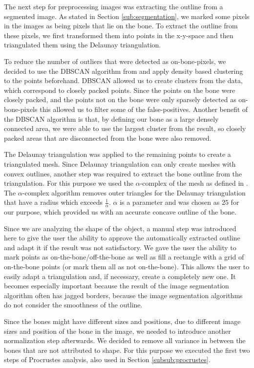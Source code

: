 \documentclass[pdftex,12pt,a4paper]{report}
\begin{document}
The next step for preprocessing images was extracting the outline from a segmented image. As stated in Section
\ref{sub:segmentation}, we marked some pixels in the images as being pixels that lie on the bone.
To extract the outline from these pixels, we first transformed them into points in the x-y-space and then
triangulated them using the Delaunay triangulation.

To reduce the number of outliers that were detected as on-bone-pixels,
we decided to use the DBSCAN algorithm from \cite{ester1996density} and apply density based clustering to the points
beforehand. DBSCAN allowed us to create clusters from the data, which correspond to closely packed points. Since
the points on the bone were closely packed, and the points not on the bone were only sparsely detected as
on-bone-pixels this allowed us to filter some of the false-positives. Another benefit of the DBSCAN algorithm is that,
by defining our bone as a large densely connected area, we were able to use the largest cluster from the result,
so closely packed areas that are disconnected from the bone were also removed.

The Delaunay triangulation was applied to the remaining points to create a triangulated mesh. Since Delaunay
triangulation can only create meshes with convex outlines, another step was required to extract the bone outline
from the triangulation. For this purpose we used the $\alpha$-complex of the mesh as defined in \cite{akkirajualpha}.
The $\alpha$-complex algorithm removes outer triangles for the Delaunay triangulation that have a radius which exceeds
$\frac{1}{\alpha}$. $\alpha$ is a parameter and was chosen as $25$ for our purpose, which provided us with
an accurate concave outline of the bone.

Since we are analyzing the shape of the object, a manual step was introduced here to give the user the ability to
approve the automatically extracted outline and adapt it if the result was not satisfactory. We gave the user the
ability to mark points as on-the-bone/off-the-bone as well as fill a rectangle with a grid of on-the-bone points (or mark them all as not on-the-bone).
This allows the user to easily adapt a triangulation and, if necessary, create a completely new one. It becomes
especially important because the result of the image segmentation algorithm often has jagged borders, because the
image segmentation algorithms do not consider the smoothness of the outline.

Since the bones might have different sizes and positions, due to different image sizes and position of the bone in
the image, we needed to introduce another normalization step afterwards. We decided to remove all variance in between the bones that are not attributed to shape. For this purpose we executed the first two steps of Procrustes
analysis, also used in Section \ref{subsub:procrustes}.
\end{document}

